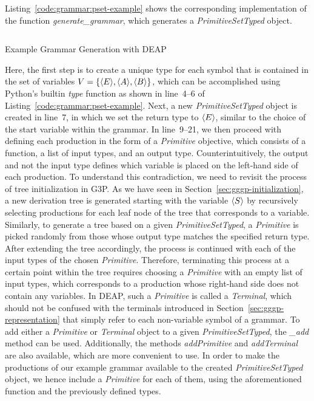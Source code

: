 Listing~\ref{code:grammar:pset-example} shows the corresponding implementation of the function \emph{generate\_grammar}, which generates a \emph{PrimitiveSetTyped} object.
\begin{listing}
	\inputminted[linenos]{python}{evostencils/grammar/pset_example.py}
	\caption{Example Grammar Generation with DEAP}
	\label{code:grammar:pset-example}
\end{listing}
Here, the first step is to create a unique type for each symbol that is contained in the set of variables $V = \left\{\langle E \rangle, \langle A \rangle, \langle B \rangle \right\}$, which can be accomplished using Python's builtin \emph{type} function as shown in line~4--6 of Listing~\ref{code:grammar:pset-example}.
Next, a new \emph{PrimitiveSetTyped} object is created in line~7, in which we set the return type to $\langle E \rangle$, similar to the choice of the start variable within the grammar.
In line~9--21, we then proceed with defining each production in the form of a \emph{Primitive} objective, which consists of a function, a list of input types, and an output type.
Counterintuitively, the output and not the input type defines which variable is placed on the left-hand side of each production.
To understand this contradiction, we need to revisit the process of tree initialization in G3P.
As we have seen in Section~\ref{sec:gggp-initialization}, a new derivation tree is generated starting with the variable $\langle S \rangle$ by recursively selecting productions for each leaf node of the tree that corresponds to a variable.
Similarly, to generate a tree based on a given \emph{PrimitiveSetTyped}, a \emph{Primitive} is picked randomly from those whose output type matches the specified return type.
After extending the tree accordingly, the process is continued with each of the input types of the chosen \emph{Primitive}.
Therefore, terminating this process at a certain point within the tree requires choosing a \emph{Primitive} with an empty list of input types, which corresponds to a production whose right-hand side does not contain any variables.
In DEAP, such a \emph{Primitive} is called a \emph{Terminal}, which should not be confused with the terminals introduced in Section~\ref{sec:gggp-representation} that simply refer to each non-variable symbol of a grammar.
To add either a \emph{Primitive} or \emph{Terminal} object to a given \emph{PrimitiveSetTyped}, the \emph{\_add} method can be used.
Additionally, the methods \emph{addPrimitive} and \emph{addTerminal} are also available, which are more convenient to use.
In order to make the productions of our example grammar available to the created \emph{PrimitiveSetTyped} object, we hence include a \emph{Primitive} for each of them, using the aforementioned function and the previously defined types.
